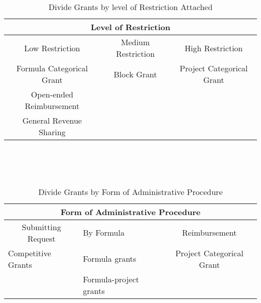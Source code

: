 \clearpage
\begin{table}[H]
    \centering
    \caption{Divide Grants by level of Restriction Attached}
    \begin{tabular}{ccc}
        \toprule
        \multicolumn{3}{c}{Level of Restriction}                                   \\
        \midrule
        Low Restriction           & Medium Restriction & High Restriction          \\
        \midrule
        Formula Categorical Grant & Block Grant        & Project Categorical Grant \\
        Open-ended Reimbursement  &                    &                           \\
        General Revenue Sharing   &                    &                           \\
        \bottomrule
    \end{tabular}%
    \label{Table 1.3}%
\end{table}%
~\\
~\\
~\\
\begin{table}[htbp]
    \centering
    \caption{Divide Grants by Form of Administrative Procedure}
    \begin{tabular}{clc}
        \toprule
        \multicolumn{3}{c}{Form of Administrative Procedure}                                                                                                     \\
        \midrule
        \multicolumn{1}{p{9.645em}}{ Submitting Request} & \multicolumn{1}{p{10.285em}}{               By Formula} & \multicolumn{1}{p{10.855em}}{Reimbursement} \\
        \midrule
        \multicolumn{1}{l}{Competitive Grants}           & Formula grants                                          & Project Categorical Grant                   \\
                                                         & Formula-project grants                                  &                                             \\
        \bottomrule
    \end{tabular}%
    \label{Table 1.4}%
\end{table}%

